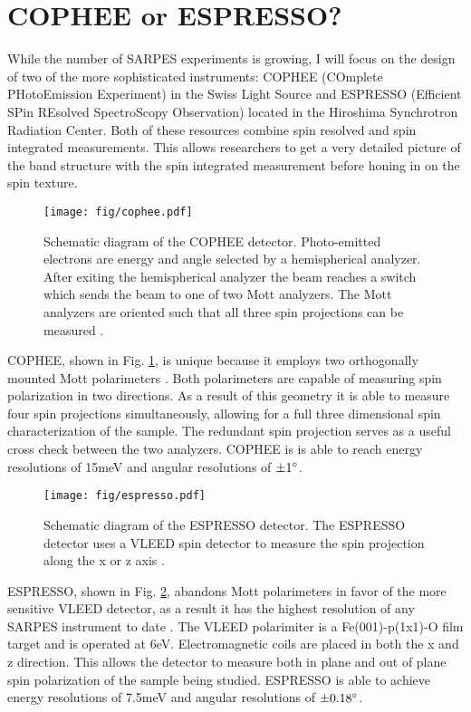 \documentclass[12pt]{article}
\begin{document}
\section{COPHEE or ESPRESSO?}
While the number of SARPES experiments is growing, I will focus on the design of two of the more sophisticated instruments:  COPHEE (COmplete PHotoEmission Experiment) in the Swiss Light Source and ESPRESSO (Efficient SPin REsolved SpectroScopy Observation) located in the Hiroshima Synchrotron Radiation Center.
Both of these resources combine spin resolved and spin integrated measurements.
This allows researchers to get a very detailed picture of the band structure with the spin integrated measurement before honing in on the spin texture.

\begin{figure}[h]
  \centering
  \texttt{[image: fig/cophee.pdf]}
  \caption{Schematic diagram of the COPHEE detector.  Photo-emitted electrons are energy and angle selected by a hemispherical analyzer.  After exiting the hemispherical analyzer the beam reaches a switch which sends the beam to one of two Mott analyzers.  The Mott analyzers are oriented such that all three spin projections can be measured \cite{Hoesch}.}
  \label{fig:cophee}
\end{figure}
COPHEE, shown in Fig. \ref{fig:cophee}, is unique because it employs two orthogonally mounted Mott polarimeters \cite{Hoesch}.
Both polarimeters are capable of measuring spin polarization in two directions.
As a result of this geometry it is able to measure four spin projections simultaneously, allowing for a full three dimensional spin characterization of the sample.
The redundant spin projection serves as a useful cross check between the two analyzers.
COPHEE is is able to reach energy resolutions of 15meV and angular resolutions of $\pm1\degree$.

\begin{figure}[h]
  \centering
  \texttt{[image: fig/espresso.pdf]}
  \caption{Schematic diagram of the ESPRESSO detector.  The ESPRESSO detector uses a VLEED spin detector to measure the spin projection along the x or z axis \cite{Okuda}.}
  \label{fig:espresso}
\end{figure}
ESPRESSO, shown in Fig. \ref{fig:espresso}, abandons Mott polarimeters in favor of the more sensitive VLEED detector, as a result it has the highest resolution of any SARPES instrument to date \cite{Okuda}.
The VLEED polarimiter is a Fe(001)-p(1x1)-O film target and is operated at 6eV.
Electromagnetic coils are placed in both the x and z direction.
This allows the detector to measure both in plane and out of plane spin polarization of the sample being studied.
ESPRESSO is able to achieve energy resolutions of 7.5meV and angular resolutions of $\pm0.18\degree$.
\end{document}
